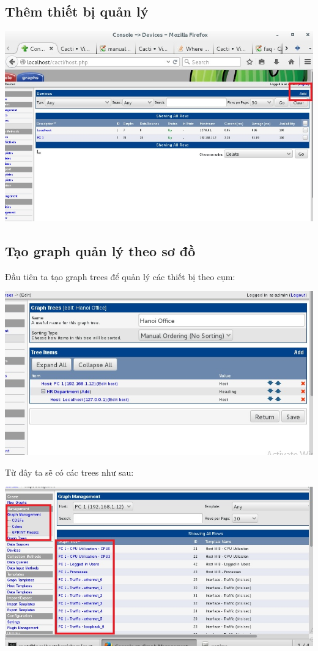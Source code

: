 \documentclass[12pt,oneside,a4paper,reqno]{report}
\begin{document}
\begin{large}
\subsection{Thêm thiết bị quản lý}
\begin{center}
	\includegraphics[scale=0.6]{images/cacti-new-device.jpg}\\
\end{center}

\subsection{Tạo graph quản lý theo sơ đồ}
Đầu tiên ta tạo graph trees để quản lý các thiết bị theo cụm:
\begin{center}
	\includegraphics[scale=0.6]{images/cacti-graph-trees.jpg}\\
\end{center}

Từ đây ta sẽ có các trees như sau:
\begin{center}
	\includegraphics[scale=0.6]{images/cacti-graph-management.jpg}\\
\end{center}


\end{large}
\end{document}
